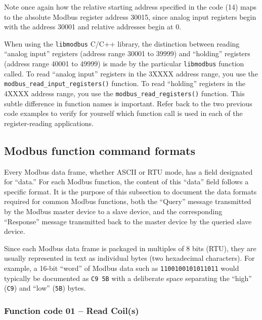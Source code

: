 \vskip 10pt

Note once again how the relative starting address specified in the code (14) maps to the absolute Modbus register address 30015, since analog input registers begin with the address 30001 and relative addresses begin at 0.  

\vskip 10pt

\filbreak

When using the \texttt{libmodbus} C/C++ library, the distinction between reading ``analog input'' registers (address range 30001 to 39999) and ``holding'' registers (address range 40001 to 49999) is made by the particular \texttt{libmodbus} function called.  To read ``analog input'' registers in the 3XXXX address range, you use the \texttt{modbus\_read\_input\_registers()} function.  To read ``holding'' registers in the 4XXXX address range, you use the \texttt{modbus\_read\_registers()} function.  This subtle difference in function names is important.  Refer back to the two previous code examples to verify for yourself which function call is used in each of the register-reading applications.







\filbreak
\subsection{Modbus function command formats}

Every Modbus data frame, whether ASCII or RTU mode, has a field designated for ``data.''  For each Modbus function, the content of this ``data'' field follows a specific format.  It is the purpose of this subsection to document the data formats required for common Modbus functions, both the ``Query'' message transmitted by the Modbus master device to a slave device, and the corresponding ``Response'' message transmitted back to the master device by the queried slave device.

Since each Modbus data frame is packaged in multiples of 8 bits (RTU), they are usually represented in text as individual bytes (two hexadecimal characters).  For example, a 16-bit ``word'' of Modbus data such as \texttt{1100100101011011} would typically be documented as \texttt{C9 5B} with a deliberate space separating the ``high'' (\texttt{C9}) and ``low'' (\texttt{5B}) bytes.  




\filbreak
\subsubsection{Function code 01 -- Read Coil(s)}

